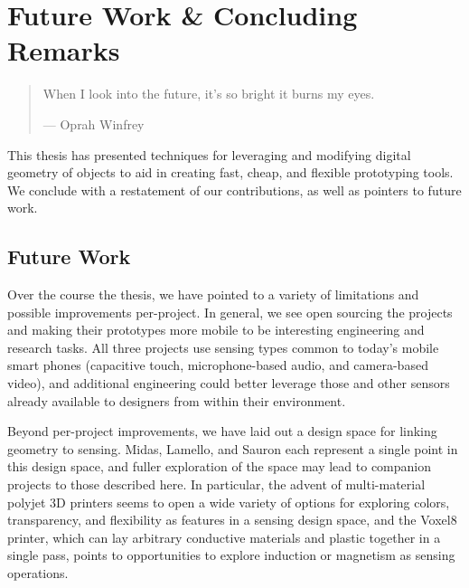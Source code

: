\chapter{Future Work \& Concluding Remarks}

\begin{quote}
When I look into the future, it's so bright it burns my eyes.

--- Oprah Winfrey
\end{quote}

This thesis has presented techniques for leveraging and modifying digital geometry of objects to aid in creating fast, cheap, and flexible prototyping tools. We conclude with a restatement of our contributions, as well as pointers to future work.



%

\section{Future Work}

Over the course the thesis, we have pointed to a variety of limitations and possible improvements per-project. In general, we see open sourcing the projects and making their prototypes more mobile to be interesting engineering and research tasks. All three projects use sensing types common to today's mobile smart phones (capacitive touch, microphone-based audio, and camera-based video), and additional engineering could better leverage those and other sensors already available to designers from within their environment.

Beyond per-project improvements, we have laid out a design space for linking geometry to sensing. Midas, Lamello, and Sauron each represent a single point in this design space, and fuller exploration of the space may lead to companion projects to those described here. In particular, the advent of multi-material polyjet 3D printers seems to open a wide variety of options for exploring colors, transparency, and flexibility as features in a sensing design space, and the Voxel8 \cite{voxel8} printer, which can lay arbitrary conductive materials and plastic together in a single pass, points to opportunities to explore induction or magnetism as sensing operations.

